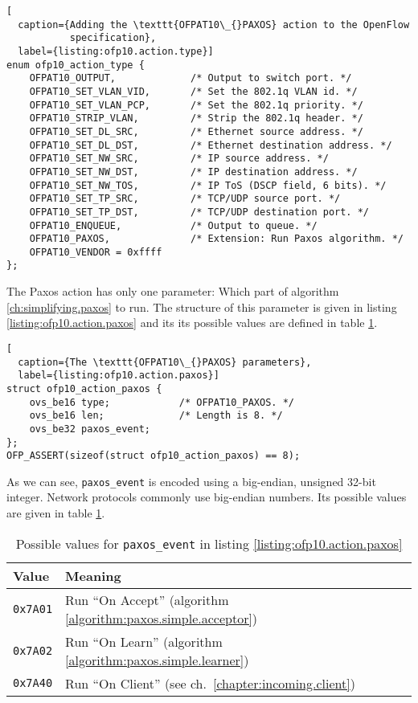 \begin{lstlisting}[
  caption={Adding the \texttt{OFPAT10\_{}PAXOS} action to the OpenFlow
           specification},
  label={listing:ofp10.action.type}]
enum ofp10_action_type {
    OFPAT10_OUTPUT,             /* Output to switch port. */
    OFPAT10_SET_VLAN_VID,       /* Set the 802.1q VLAN id. */
    OFPAT10_SET_VLAN_PCP,       /* Set the 802.1q priority. */
    OFPAT10_STRIP_VLAN,         /* Strip the 802.1q header. */
    OFPAT10_SET_DL_SRC,         /* Ethernet source address. */
    OFPAT10_SET_DL_DST,         /* Ethernet destination address. */
    OFPAT10_SET_NW_SRC,         /* IP source address. */
    OFPAT10_SET_NW_DST,         /* IP destination address. */
    OFPAT10_SET_NW_TOS,         /* IP ToS (DSCP field, 6 bits). */
    OFPAT10_SET_TP_SRC,         /* TCP/UDP source port. */
    OFPAT10_SET_TP_DST,         /* TCP/UDP destination port. */
    OFPAT10_ENQUEUE,            /* Output to queue. */
    OFPAT10_PAXOS,              /* Extension: Run Paxos algorithm. */
    OFPAT10_VENDOR = 0xffff
};
\end{lstlisting}

The Paxos action has only one parameter: Which part of algorithm
\ref{ch:simplifying.paxos} to run.  The structure of this parameter is given
in listing \ref{listing:ofp10.action.paxos} and its its possible values are
defined in table \ref{table:paxos.event.codes}.

\begin{lstlisting}[
  caption={The \texttt{OFPAT10\_{}PAXOS} parameters},
  label={listing:ofp10.action.paxos}]
struct ofp10_action_paxos {
    ovs_be16 type;            /* OFPAT10_PAXOS. */
    ovs_be16 len;             /* Length is 8. */
    ovs_be32 paxos_event;
};
OFP_ASSERT(sizeof(struct ofp10_action_paxos) == 8);
\end{lstlisting}

As we can see, \texttt{paxos\_{}event} is encoded using a big-endian, unsigned
32-bit integer.  Network protocols commonly use big-endian numbers.
%
Its possible values are given in table \ref{table:paxos.event.codes}.

\begin{table}[H]
  \centering
  \begin{tabular}{|l|l|}
    \hline
      \textbf{Value} &
      \textbf{Meaning}
      \\

    \hline
      \texttt{0x7A01} &
      Run ``On Accept'' (algorithm \ref{algorithm:paxos.simple.acceptor})
      \\

    \hline
      \texttt{0x7A02} &
      Run ``On Learn'' (algorithm \ref{algorithm:paxos.simple.learner})
      \\

    \hline
      \texttt{0x7A40} &
      Run ``On Client'' (see ch.~\ref{chapter:incoming.client})
      \\

    \hline
  \end{tabular}
  \caption{Possible values for \texttt{paxos\_{}event} in listing
           \ref{listing:ofp10.action.paxos}}
  \label{table:paxos.event.codes}
\end{table}

